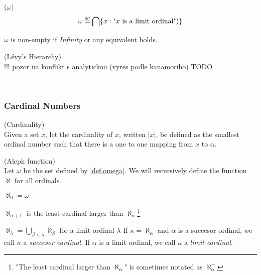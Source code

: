 \begin{definition}{($\omega$)}\label{def:omega}\\ %
\begin{equation}
\omega \defeq \bigcap\{x : \mbox{"$x$ is a limit ordinal"})\}
\end{equation}
\end{definition}
$\omega$ is non-empty if \emph{Infinity} or any equivalent holds.

\begin{definition}{(Lévy's Hierarchy)}\\
!!! pozor na konflikt s analytickou (vyres podle kanamoriho)
TODO
\end{definition}
\

\subsubsection{Cardinal Numbers}

\begin{definition}{(Cardinality)}\\
Given a set $x$, let the cardinality of $x$, written $|x|$, be defined as the smallest ordinal number such that there is a one to one mapping from $x$ to $\alpha$.
\end{definition}

\begin{definition}{(Aleph function)}\label{def:aleph}\\
Let $\omega$ be the set defined by \ref{def:omega}.
We will recursively define the function $\aleph$ for all ordinals.
\bce[(i)]
\item $\aleph_0 = \omega$
\item $\aleph_{\alpha+1}$ is the least cardinal larger than $\aleph_\alpha$\footnote{"The least cardinal larger than $\aleph_\alpha$" is sometimes notated as $\aleph_\alpha^{+}$}
\item $\aleph_\lambda = \bigcup_{\beta < \lambda}\aleph_\beta$ for a limit ordinal $\lambda$
\ece
If $\kappa = \aleph_\alpha$ and $\alpha$ is a succesor ordinal, we call $\kappa$ a \emph{succesor cardinal}. If $\alpha$ is a limit ordinal, we call $\kappa$ a \emph{limit cardinal}.
\end{definition} %

